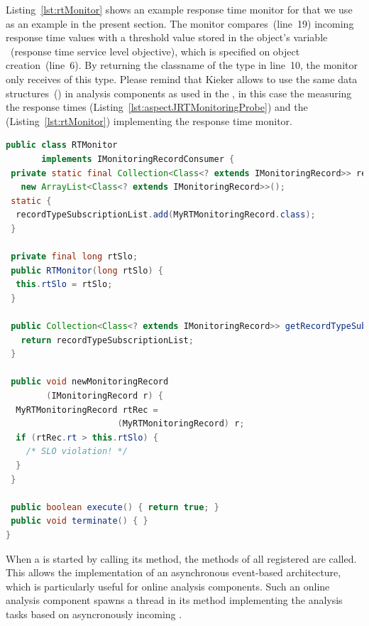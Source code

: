 Listing~\ref{lst:rtMonitor} shows an example response time monitor for %
 that we use as an  example in the present section. %
The monitor compares~(line~19) incoming response time values  with a threshold value %
stored in the object's variable ~(response time service level objective), %
which is specified on object creation~(line~6). %
By returning the classname of the \MonitoringRecord{} type  %
in line~10, the monitor only receives \MonitoringRecords{} of this type. %
Please remind that Kieker allows to use
the same data structures~(\MonitoringRecords{}) in analysis components as used in the %
\MonitoringProbes{}, in this case the \MonitoringProbe{} measuring the response times %
(Listing~\ref{lst:aspectJRTMonitoringProbe}) and the \MonitoringRecordConsumer{} %
(Listing~\ref{lst:rtMonitor}) implementing the response time monitor.


\begin{lstlisting}[float,language=Java, caption=Example response time monitor, label=lst:rtMonitor,escapechar=\%]
public class RTMonitor
       implements IMonitoringRecordConsumer {
 private static final Collection<Class<? extends IMonitoringRecord>> recordTypeSubscriptionList =
   new ArrayList<Class<? extends IMonitoringRecord>>();
 static {
  recordTypeSubscriptionList.add(MyRTMonitoringRecord.class);
 }

 private final long rtSlo;
 public RTMonitor(long rtSlo) {
  this.rtSlo = rtSlo;
 }

 public Collection<Class<? extends IMonitoringRecord>> getRecordTypeSubscriptionList(){
   return recordTypeSubscriptionList;
 }

 public void newMonitoringRecord
        (IMonitoringRecord r) {
  MyRTMonitoringRecord rtRec =
                      (MyRTMonitoringRecord) r;
  if (rtRec.rt > this.rtSlo) {
    /* SLO violation! */
  }
 }

 public boolean execute() { return true; }
 public void terminate() { }
}
\end{lstlisting}

When a \TpanInstance{} is started by calling its  method, the
 methods of all registered \MonitoringRecordConsumers{} %
are called. %
This allows the implementation of an asynchronous event-based architecture,
which is particularly useful for online analysis components. %
Such an online analysis component spawns a thread in its  %
method implementing the analysis tasks based on asyncronously incoming \MonitoringRecords{}. %
